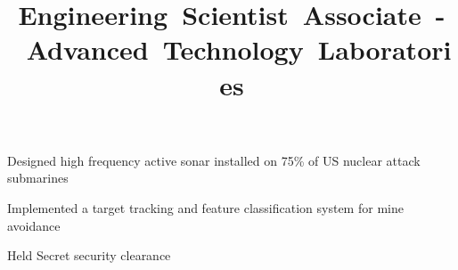 \documentclass[12pt, line]{res}
\let\tempone\itemize
\let\temptwo\enditemize
\renewenvironment{itemize}{%
  \setlength{\topsep}{0pt}%
  \setlength{\partopsep}{0pt}%
  \tempone
  \renewcommand{\labelitemi}{$\bullet$}%
  \vspace{-0.25in}%
  \setlength{\itemsep}{3pt}%
  \setlength{\parsep}{0pt}%
}{%
  \temptwo
}
\newcommand{\Cpp}{C\kern-0.05em \raisebox{0.4ex}{\tiny\textbf{++}}}
\begin{document}
\begin{resume}
  \title{\mbox{Engineering Scientist Associate - Advanced Technology Laboratories}} %
  \begin{position}
    \begin{itemize}
      \item Designed high frequency active sonar installed on 75\% of US nuclear attack submarines
      \item Implemented a target tracking and feature classification system for mine avoidance
      \item Held Secret security clearance
    \end{itemize}
  \end{position}



\end{resume}
\end{document}
